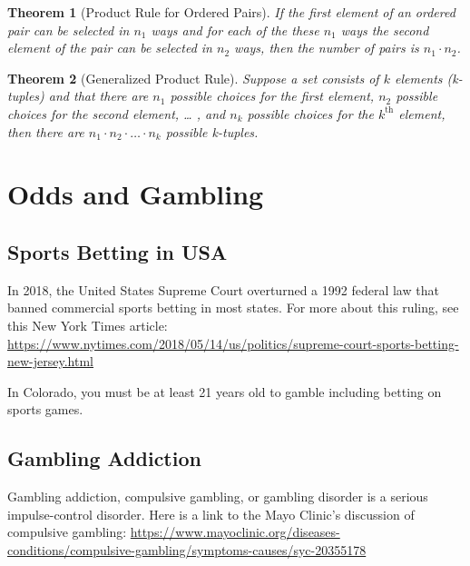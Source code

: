 \documentclass[
  11pt,
]{book}
\newtheorem{theorem}{Theorem}[chapter]
\theoremstyle{definition}
\theoremstyle{definition}
\theoremstyle{definition}
\theoremstyle{definition}
\theoremstyle{remark}
\begin{document}
\begin{theorem}[Product Rule for Ordered Pairs]
If the first element of an ordered pair can be selected in \(n_1\) ways and for each of the these \(n_1\) ways the second element of the pair can be selected in \(n_2\) ways, then the number of pairs is \(n_1 \cdot n_2\).
\end{theorem}

\begin{theorem}[Generalized Product Rule]
Suppose a set consists of \(k\) elements (k-tuples) and that there are \(n_1\) possible choices for the first element, \(n_2\) possible choices for the second element, \ldots{} , and \(n_k\) possible choices for the \(k^\text{th}\) element, then there are \(n_1 \cdot n_2 \cdot \ldots \cdot n_k\) possible k-tuples.
\end{theorem}

\newpage

\hypertarget{odds-and-gambling}{%
\section{Odds and Gambling}\label{odds-and-gambling}}

\hypertarget{sports-betting-in-usa}{%
\subsection{Sports Betting in USA}\label{sports-betting-in-usa}}

In 2018, the United States Supreme Court overturned a 1992 federal law that banned commercial sports betting in most states. For more about this ruling, see this New York Times article: \url{https://www.nytimes.com/2018/05/14/us/politics/supreme-court-sports-betting-new-jersey.html}

In Colorado, you must be at least 21 years old to gamble including betting on sports games.

\hypertarget{gambling-addiction}{%
\subsection{Gambling Addiction}\label{gambling-addiction}}

Gambling addiction, compulsive gambling, or gambling disorder is a serious impulse-control disorder. Here is a link to the Mayo Clinic's discussion of compulsive gambling: \url{https://www.mayoclinic.org/diseases-conditions/compulsive-gambling/symptoms-causes/syc-20355178}
\end{document}
